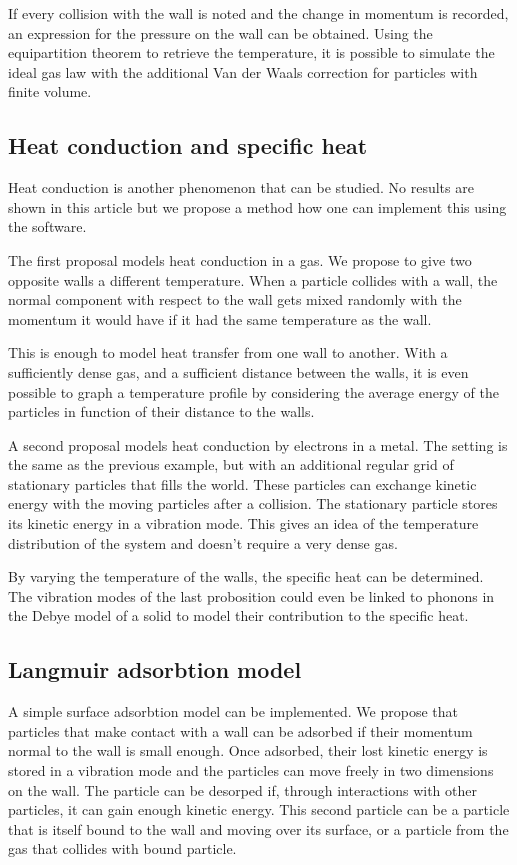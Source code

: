 If every collision with the wall is noted and the change in momentum is 
recorded, an expression for the pressure on the wall can be obtained. Using 
the equipartition theorem to retrieve the temperature, it is possible to 
simulate the ideal gas law with the additional Van der Waals correction for 
particles with finite volume.


\subsection{Heat conduction and specific heat}

Heat conduction is another phenomenon that can be studied. No results are shown 
in this article but we propose a method how one can implement this using the 
software.

The first proposal models heat conduction in a gas. We propose to give two 
opposite walls a different temperature. When a particle collides with a 
wall, the normal component with respect to the wall gets mixed randomly 
with the momentum it would have if it had the same temperature as the wall.  

This is enough to model heat transfer from one wall to another. With a 
sufficiently dense gas, and a sufficient distance between the walls, it is 
even possible to graph a temperature profile by considering the average 
energy of the particles in function of their distance to the walls.

A second proposal models heat conduction by electrons in a metal. The 
setting is the same as the previous example, but with an additional regular 
grid of stationary particles that fills the world. These particles can 
exchange kinetic energy with the moving particles after a collision. The 
stationary particle stores its kinetic energy in a vibration mode. This 
gives an idea of the temperature distribution of the system and doesn't 
require a very dense gas.

By varying the temperature of the walls, the specific heat can be 
determined. The vibration modes of the last probosition could even be 
linked to phonons in the Debye model of a solid to model their contribution 
to the specific heat.


\subsection{Langmuir adsorbtion model}

A simple surface adsorbtion model can be implemented. We propose that particles 
that make contact with a wall can be adsorbed if their momentum normal to the 
wall is small enough. Once adsorbed, their lost kinetic energy is stored in a 
vibration mode and the particles can move freely in two dimensions on the 
wall.  The particle can be desorped if, through interactions with other 
particles, it can gain enough kinetic energy. This second particle can be a 
particle that is itself bound to the wall and moving over its surface, or a 
particle from the gas that collides with bound particle.

